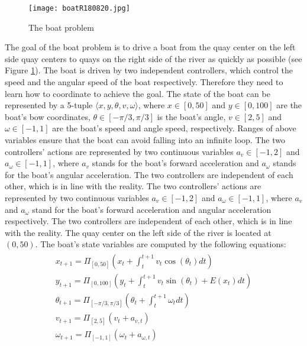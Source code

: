 \documentclass[journal,transmag]{IEEEtran}
\begin{document}
\begin{figure}[h!]
\centering
\texttt{[image: boatR180820.jpg]}
\caption{The boat problem}
\label{fig:boat}
\end{figure}

The goal of the boat problem is to drive a boat from the quay center on the left side quay centers to quays  on the right side of the river as quickly as possible (see Figure \ref{fig:boat}). The boat is driven by two independent controllers, which control the speed and the angular speed of the boat respectively. Therefore they need to learn how to coordinate to achieve the goal. The state of the boat can be represented by a 5-tuple $\langle x,y,\theta,v,\omega\rangle$, where $x\in [0,50] $ and $y\in [0,100]$ are the boat's bow coordinates, $\theta \in [-\pi/3,\pi/3]$ is the boat's angle, $v\in [2,5]$ and $\omega\in [-1,1]$ are the boat's speed and angle speed, respectively. Ranges of above variables ensure that the boat can avoid falling into an infinite loop. The two controllers' actions are represented by two continuous variables $a_v\in [-1,2]$ and $a_{\omega} \in [-1,1]$, where $a_v $ stands for the boat's forward acceleration and $a_{\omega}$ stands for the boat's angular acceleration. The two controllers are independent of each other, which is in line with the reality. The two controllers' actions are represented by two continuous variables $a_v\in [-1,2]$ and $a_{\omega} \in [-1,1]$, where $a_v $ and $a_{\omega}$ stand for the boat's forward acceleration and angular acceleration respectively. The two controllers are independent of each other, which is in line with the reality. The quay center on the left side of the river is located at $(0,50)$. The boat's state variables are computed by the following equations:
\begin{equation}
\label{statevaluable1}
\begin{split}
\begin{array}{l}
{x_{t + 1}} = {\Pi _{[0,50]}}( {{x_t} + \int_t^{t + 1} {{v_t}\cos \left( {{\theta _t}} \right)} dt} )\\
{y_{t + 1}} = {\Pi _{[0,100]}}( {{y_t} + \int_t^{t + 1} {{v_t}\sin \left( {{\theta _t}} \right) + E( {{x_t}} )dt} } )\\
{\theta _{t + 1}} = {\Pi _{[ - \pi /3,\pi /3]}}( {{\theta _t} + \int_t^{t + 1} {{\omega _t}dt} } )\\
{v_{t + 1}} = {\Pi _{[2,5]}}\left( {{v_t} + {a_{v,t}}} \right)\\
{\omega _{t + 1}} = {\Pi _{[ - 1,1]}}\left( {{\omega _t} + {a_{\omega ,t}}} \right)
\end{array}
\end{split}
\end{equation}
\end{document}
